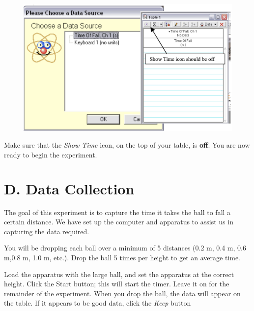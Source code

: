 \begin{figure}[ht]
  \centerline{\includegraphics[scale=0.4]{resources/photo6.jpg}}
\end{figure}

  Make sure that the \emph{Show Time} icon, on the top of your table, is \textbf{off}. 
You are now ready to begin the experiment.

\section{D. Data Collection}

  The goal of this experiment is to capture the time it takes the ball to fall a certain distance.
We have set up the computer and apparatus to assist us in capturing the data required.

  You will be dropping each ball over a minimum of 5 distances 
(0.2 m, 0.4 m, 0.6 m,0.8 m, 1.0 m, etc.). Drop the ball 5 times per height 
to get an average time.

  Load the apparatus with the large ball, and set the apparatus at the correct 
height. Click the Start button; this will start the timer. Leave it on 
for the remainder of the experiment. When you drop the ball, the data will 
appear on the table. If it appears to be good data, click the \emph{Keep} button

